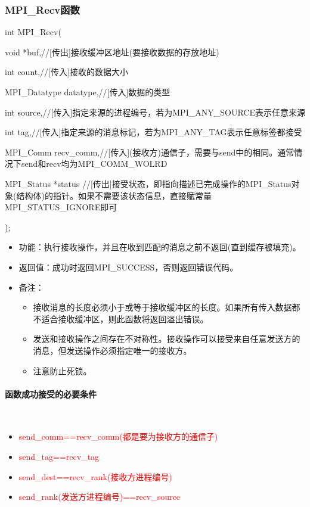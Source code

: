 \documentclass[UTF8]{article}%
\begin{document}
\subsubsection{MPI\_Recv函数}

int MPI\_Recv(

    \qquad void            *buf,//[传出]接收缓冲区地址(要接收数据的存放地址)

    \qquad int             count,//[传入]接收的数据大小

    \qquad MPI\_Datatype   datatype,//[传入]数据的类型

    \qquad int             source,//[传入]指定来源的进程编号，若为MPI\_ANY\_SOURCE表示任意来源

    \qquad int             tag,//[传入]指定来源的消息标记，若为MPI\_ANY\_TAG表示任意标签都接受

    \qquad MPI\_Comm       recv\_comm,//[传入](接收方)通信子，需要与send中的相同。通常情况下send和recv均为MPI\_COMM\_WOLRD

    \qquad MPI\_Status      *status //[传出]接受状态，即指向描述已完成操作的MPI\_Status对象(结构体)的指针。如果不需要该状态信息，直接赋常量MPI\_STATUS\_IGNORE即可

);

\begin{itemize}
    \item 功能：执行接收操作，并且在收到匹配的消息之前不返回(直到缓存被填充)。
    \item 返回值：成功时返回MPI\_SUCCESS，否则返回错误代码。
    \item 备注：
    
    {
        \begin{itemize}
            \item 接收消息的长度必须小于或等于接收缓冲区的长度。如果所有传入数据都不适合接收缓冲区，则此函数将返回溢出错误。
            \item 发送和接收操作之间存在不对称性。接收操作可以接受来自任意发送方的消息，但发送操作必须指定唯一的接收方。
            \item 注意防止死锁。
        \end{itemize}
    }

\end{itemize}

\paragraph{函数成功接受的必要条件}~{}

\begin{itemize}
    \item \textcolor{red}{send\_comm==recv\_comm(都是要为接收方的通信子)}
    \item \textcolor{red}{send\_tag==recv\_tag}
    \item \textcolor{red}{send\_dest==recv\_rank(接收方进程编号)}
    \item \textcolor{red}{send\_rank(发送方进程编号)==recv\_source}
\end{itemize}
\end{document}
